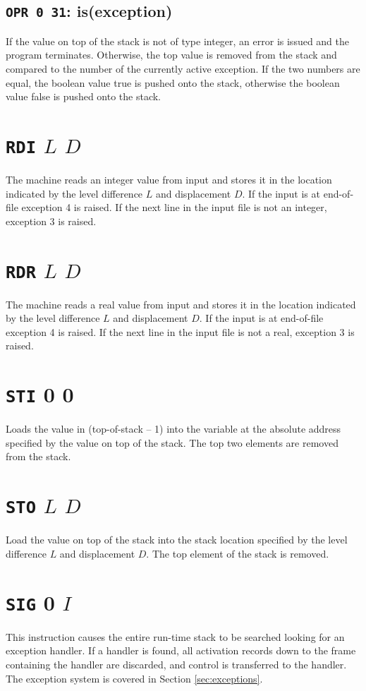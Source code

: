 \documentclass[a4paper,10pt]{report}
\begin{document}
\subsection{\texttt{OPR 0 31}: is(exception)}
\label{sec:instr:OPR31}
If the value on top of the stack is not of type integer, an error is
issued and the program terminates.  Otherwise, the top value is
removed from the stack and compared to the number of the currently
active exception.  If the two numbers are equal, the boolean value
true is pushed onto the stack, otherwise the boolean value false is
pushed onto the stack.

\section{\texttt{RDI} $L$ $D$}
\label{sec:instr:RDI}
The machine reads an integer value from input and stores it in the
location indicated by the level difference $L$ and displacement $D$.
If the input is at end-of-file exception 4 is raised.  If the next
line in the input file is not an integer, exception 3 is raised.

\section{\texttt{RDR} $L$ $D$}
\label{sec:instr:RDR}
The machine reads a real value from input and stores it in the
location indicated by the level difference $L$ and displacement $D$.
If the input is at end-of-file exception 4 is raised.  If the next
line in the input file is not a real, exception 3 is raised.

\section{\texttt{STI} 0 0}
Loads the value in (top-of-stack -- 1) into the variable at the
absolute address specified by the value on top of the stack.  The top
two elements are removed from the stack.

\section{\texttt{STO} $L$ $D$}
Load the value on top of the stack into the stack location specified
by the level difference $L$ and displacement $D$.  The top element of
the stack is removed.

\section{\texttt{SIG} 0 $I$}
\label{sec:instr:SIG}
This instruction causes the entire run-time stack to be searched
looking for an exception handler.  If a handler is found, all
activation records down to the frame containing the handler are
discarded, and control is transferred to the handler.  The exception
system is covered in Section \ref{sec:exceptions}.
\end{document}
